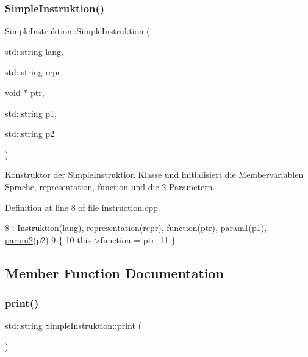 \subsubsection{\texorpdfstring{Simple\+Instruktion()}{SimpleInstruktion()}}
{\footnotesize\ttfamily Simple\+Instruktion\+::\+Simple\+Instruktion (\begin{DoxyParamCaption}\item[{std\+::string}]{lang,  }\item[{std\+::string}]{repr,  }\item[{void $\ast$}]{ptr,  }\item[{std\+::string}]{p1,  }\item[{std\+::string}]{p2 }\end{DoxyParamCaption})}

Konstruktor der \mbox{\hyperlink{class_simple_instruktion}{Simple\+Instruktion}} Klasse und initialisiert die Membervariablen \mbox{\hyperlink{class_sprache}{Sprache}}, representation, function und die 2 Parametern. 

Definition at line 8 of file instruction.\+cpp.


\begin{DoxyCode}
8                                                                                                           :
       \mbox{\hyperlink{class_instruktion_a26d54febd2022c7402a22a8b55ba097a}{Instruktion}}(lang), \mbox{\hyperlink{class_simple_instruktion_a1e2b7a4f9d38ec973e030062570c4fe2}{representation}}(repr), \textcolor{keyword}{function}(ptr), 
      \mbox{\hyperlink{class_simple_instruktion_a8a19958470817ee23384ac0c64fdc393}{param1}}(p1), \mbox{\hyperlink{class_simple_instruktion_a9682f053735fffdf061ec43a989482e2}{param2}}(p2) 
9 \{
10     this->\textcolor{keyword}{function} = ptr;
11 \}
\end{DoxyCode}


\subsection{Member Function Documentation}
\mbox{\label{class_simple_instruktion_a0533865319bd39a0ecd1db463d488cb8}} 
\subsubsection{\texorpdfstring{print()}{print()}}
{\footnotesize\ttfamily std\+::string Simple\+Instruktion\+::print (\begin{DoxyParamCaption}{ }\end{DoxyParamCaption})\hspace{0.3cm}{\ttfamily [virtual]}}

